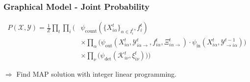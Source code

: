 \begin{frame}[shrink=25]
    \frametitle{Graphical Model - Joint Probability}
    \begin{align*}
        P(\mathcal{X},\mathcal{Y}) = \frac{1}{Z}\prod_t\prod_i
        \Bigg(&\psi_{\text{count}}(\{X_{i\alpha}^t\}_{\alpha \in I_i^t},f_{i}^t) \\ \nonumber
        &\times\prod_{\alpha}\Big(\psi_{\mathrm{out}}(X_{i\alpha}^t, \mathcal{Y}_{i\alpha\rightarrow}^{t},
        f_{i\alpha}^t, \Xi_{i\alpha\rightarrow}^{t}) \cdot \psi_{\mathrm{in}}(X_{i\alpha}^{t},
        \mathcal{Y}_{\rightarrow i\alpha}^{t-1})\Big) \\ \nonumber
        &\times\prod_{\nu}\Big(\psi_{\text{det}}(\mathcal{K}_{i\nu}^t, \xi_{i\nu}^t)\Big)\Bigg)
    \end{align*}
    \vspace{10pt}
    \begin{center}
        \Large{$\Rightarrow$ Find MAP solution with integer linear programming.}
    \end{center}
\end{frame}


